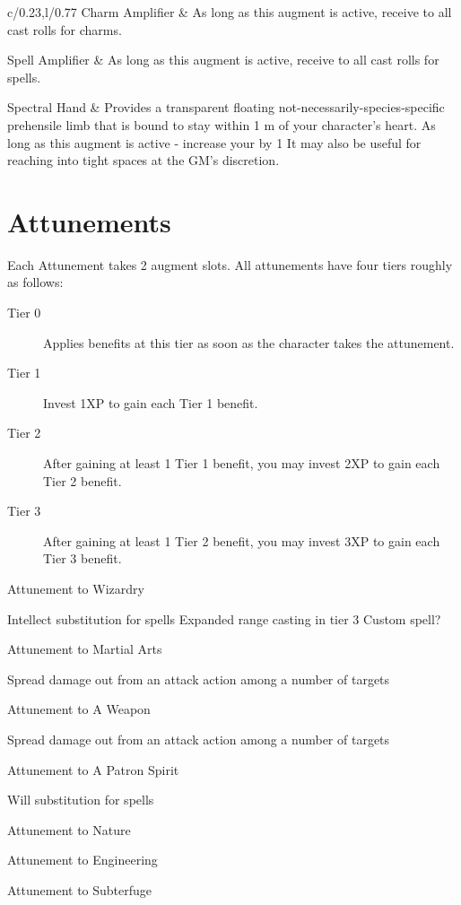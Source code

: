 \begin{GRPtablewide}
\begin{GRPtabular}{c\GRPtitlecellformat/0.23,l/0.77}
		Charm Amplifier & As long as this augment is active, receive  to all cast rolls for charms. \XX

		Spell Amplifier & As long as this augment is active, receive  to all cast rolls for spells. \XX

		Spectral Hand & Provides a transparent floating not-necessarily-species-specific prehensile limb that is bound to stay within 1 m of your character's heart.
		As long as this augment is active - increase your  by 1
		It may also be useful for reaching into tight spaces at the GM's discretion.\XX
	\end{GRPtabular}
\end{GRPtablewide}



\section{Attunements}

Each Attunement takes 2 augment slots. All attunements have four tiers roughly as follows:

\begin{description}
	\item[Tier 0] Applies benefits at this tier as soon as the character takes the attunement.
	\item[Tier 1] Invest 1XP to gain each Tier 1 benefit.
	\item[Tier 2] After gaining at least 1 Tier 1 benefit, you may invest 2XP to gain each Tier 2 benefit.
	\item[Tier 3] After gaining at least 1 Tier 2 benefit, you may invest 3XP to gain each Tier 3 benefit.
\end{description}

Attunement to Wizardry

	Intellect substitution for spells
	Expanded range casting in tier 3
	Custom spell?

Attunement to Martial Arts

Spread damage out from an attack action among a number of targets

Attunement to A Weapon

Spread damage out from an attack action among a number of targets

Attunement to A Patron Spirit

	Will substitution for spells

Attunement to Nature

Attunement to Engineering

Attunement to Subterfuge

